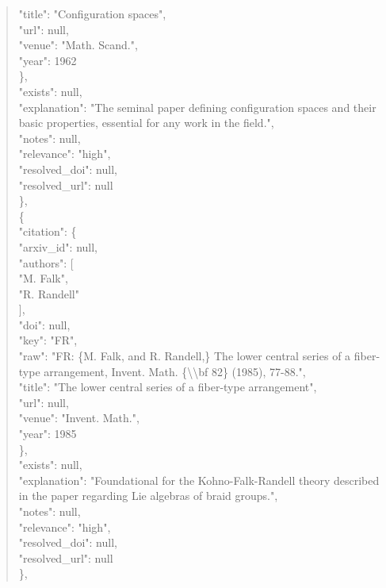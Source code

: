 \documentclass[11pt]{article}
\begin{document}
\begin{quote}
        "title": "Configuration spaces",\\
        "url": null,\\
        "venue": "Math. Scand.",\\
        "year": 1962\\
      \},\\
      "exists": null,\\
      "explanation": "The seminal paper defining configuration spaces and their basic properties, essential for any work in the field.",\\
      "notes": null,\\
      "relevance": "high",\\
      "resolved\_doi": null,\\
      "resolved\_url": null\\
    \},\\
    \{\\
      "citation": \{\\
        "arxiv\_id": null,\\
        "authors": [\\
          "M. Falk",\\
          "R. Randell"\\
        ],\\
        "doi": null,\\
        "key": "FR",\\
        "raw": "FR: \{M. Falk, and R. Randell,\} The lower central series of a fiber-type arrangement, Invent. Math. \{\textbackslash{}\textbackslash{}bf 82\} (1985), 77-88.",\\
        "title": "The lower central series of a fiber-type arrangement",\\
        "url": null,\\
        "venue": "Invent. Math.",\\
        "year": 1985\\
      \},\\
      "exists": null,\\
      "explanation": "Foundational for the Kohno-Falk-Randell theory described in the paper regarding Lie algebras of braid groups.",\\
      "notes": null,\\
      "relevance": "high",\\
      "resolved\_doi": null,\\
      "resolved\_url": null\\
    \},\\

\end{quote}
\end{document}
